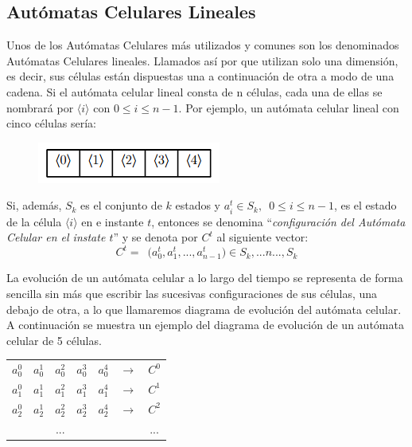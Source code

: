 \subsection{Autómatas Celulares Lineales}
Unos de los Autómatas Celulares más utilizados y comunes son los denominados Autómatas Celulares lineales. Llamados así por que utilizan solo una dimensión, es decir, sus células están dispuestas una a continuación de otra a modo de una cadena. Si el autómata celular lineal consta de n células, cada una de ellas se nombrará por $\langle i \rangle$ con $ 0  \leq i \leq n-1 $. Por ejemplo, un autómata celular lineal con cinco células sería:

\begin{figure}[H]
\centering
\includegraphics[scale=0.7]{imagenes/name_cell.png}
\label{fig:lineal_1}
\end{figure}

Si, además, $S_k$ es el conjunto de $k$ estados y $a_i^t \in S_k, \enspace 0 \leq i \leq n-1$, es el estado de la célula $\langle i \rangle$ en e instante $t$, entonces se denomina ``\textit{configuración del Autómata Celular en el instate $t$}'' y se denota por $C^t$ al siguiente vector:
$$C^t = \enspace \big( a_0^t,a_1^t, ..., a_{n-1}^t \big) \in S_k , ... n ... , S_k$$

La evolución de un autómata celular a lo largo del tiempo se representa de forma sencilla sin más que escribir las sucesivas configuraciones de sus células, una debajo de otra, a lo que llamaremos diagrama de evolución del autómata celular. A continuación se muestra un ejemplo del diagrama de evolución de un autómata celular de 5 células.

\begin{table}[H]
\centering
\begin{tabular}{lllllll}
\cline{1-5}
\multicolumn{1}{|l|}{$a_0^0$} & \multicolumn{1}{l|}{$a_0^1$} & \multicolumn{1}{l|}{$a_0^2$} & \multicolumn{1}{l|}{$a_0^3$} & \multicolumn{1}{l|}{$a_0^4$} & $\rightarrow$ & $C^0$ \\ \cline{1-5}
\multicolumn{1}{|l|}{$a_1^0$} & \multicolumn{1}{l|}{$a_1^1$} & \multicolumn{1}{l|}{$a_1^2$} & \multicolumn{1}{l|}{$a_1^3$} & \multicolumn{1}{l|}{$a_1^4$} & $\rightarrow$ & $C^1$ \\ \cline{1-5}
\multicolumn{1}{|l|}{$a_2^0$} & \multicolumn{1}{l|}{$a_2^1$} & \multicolumn{1}{l|}{$a_2^2$} & \multicolumn{1}{l|}{$a_2^3$} & \multicolumn{1}{l|}{$a_2^4$} & $\rightarrow$ & $C^2$ \\ \cline{1-5}
 &  & \multicolumn{1}{c}{...} &  &  &  & \multicolumn{1}{c}{...}
\end{tabular}
\end{table}

